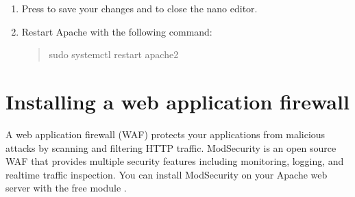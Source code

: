\documentclass[a4paper,10pt,english,openany,oneside]{sphinxmanual}
\begin{document}
\begin{enumerate}
\item {} 
\sphinxAtStartPar
Press  to save your changes and  to close the nano editor.

\item {} 
\sphinxAtStartPar
Restart Apache with the following command:
\begin{quote}

\begin{sphinxVerbatim}[commandchars=\\\{\}]
\PYGZdl{} sudo systemctl restart apache2
\end{sphinxVerbatim}
\end{quote}

\end{enumerate}


\section{Installing a web application firewall}
\label{\detokenize{hardening-apache:installing-a-web-application-firewall}}
\sphinxAtStartPar
A web application firewall (WAF) protects your applications from malicious attacks by scanning and filtering HTTP traffic. ModSecurity is an open source WAF that provides multiple security features including monitoring, logging, and real\sphinxhyphen{}time traffic inspection. You can install ModSecurity on your Apache web server with the free module .
\end{document}
